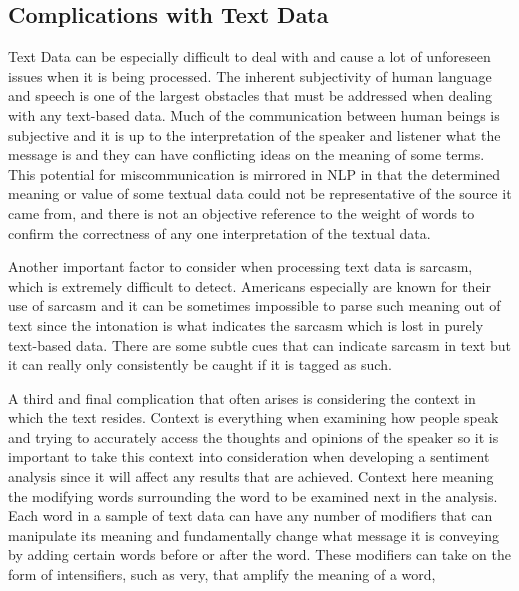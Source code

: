 \subsection{Complications with Text Data}
Text Data can be especially difficult to deal with and cause a lot of unforeseen issues when it is being processed.
The inherent subjectivity of human language and speech is one of the largest obstacles that must be addressed when dealing with any text-based data.
Much of the communication between human beings is subjective and it is up to the interpretation of the speaker and listener what the message is and they can have conflicting ideas on the meaning of some terms.
This potential for miscommunication is mirrored in NLP in that the determined meaning or value of some textual data could not be representative of the source it came from, and there is not an objective reference to the weight of words to confirm the correctness of any one interpretation of the textual data.

Another important factor to consider when processing text data is sarcasm, which is extremely difficult to detect.
Americans especially are known for their use of sarcasm and it can be sometimes impossible to parse such meaning out of text since the intonation is what indicates the sarcasm which is lost in purely text-based data.
There are some subtle cues that can indicate sarcasm in text but it can really only consistently be caught if it is tagged as such.

A third and final complication that often arises is considering the context in which the text resides.
Context is everything when examining how people speak and trying to accurately access the thoughts and opinions of the speaker so it is important to take this context into consideration when developing a sentiment analysis since it will affect any results that are achieved.
Context here meaning the modifying words surrounding the word to be examined next in the analysis.
Each word in a sample of text data can have any number of modifiers that can manipulate its meaning and fundamentally change what message it is conveying by adding certain words before or after the word.
These modifiers can take on the form of intensifiers, such as very, that amplify the meaning of a word, 

